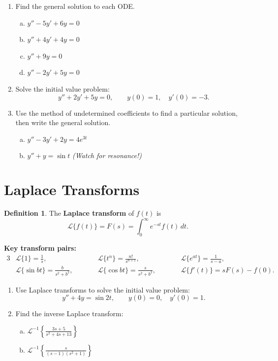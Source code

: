 \documentclass[11pt]{article}
\theoremstyle{definition}
\newtheorem*{definition*}{Definition}
\newcommand{\Lap}{\mathscr{L}}
\newcommand{\invLap}{\mathscr{L}^{-1}}
\begin{document}
\begin{enumerate}[resume]
\item Find the general solution to each ODE.
\begin{enumerate}[(a)]
  \item $y'' - 5y' + 6y = 0$
  \item $y'' + 4y' + 4y = 0$
  \item $y'' + 9y = 0$
  \item $y'' - 2y' + 5y = 0$
\end{enumerate}

\item Solve the initial value problem:
\[
  y'' + 2y' + 5y = 0, \qquad y(0) = 1, \quad y'(0) = -3.
\]

\item Use the method of undetermined coefficients to find a particular solution, then write the general solution.
\begin{enumerate}[(a)]
  \item $y'' - 3y' + 2y = 4e^{3t}$
  \item $y'' + y = \sin t$ \quad \emph{(Watch for resonance!)}
\end{enumerate}
\end{enumerate}

\section*{Laplace Transforms}

\begin{definition*}
The \textbf{Laplace transform} of $f(t)$ is
\[
  \Lap\{f(t)\} = F(s) = \int_0^{\infty} e^{-st} f(t) \, dt.
\]
\end{definition*}

\textbf{Key transform pairs:}
\begin{alignat*}{3}
  &\Lap\{1\} = \frac{1}{s}, \qquad
  &&\Lap\{t^n\} = \frac{n!}{s^{n+1}}, \qquad
  &&\Lap\{e^{at}\} = \frac{1}{s - a}, \\[6pt]
  &\Lap\{\sin bt\} = \frac{b}{s^2 + b^2}, \qquad
  &&\Lap\{\cos bt\} = \frac{s}{s^2 + b^2}, \qquad
  &&\Lap\{f'(t)\} = s F(s) - f(0).
\end{alignat*}

\begin{enumerate}[resume]
\item Use Laplace transforms to solve the initial value problem:
\[
  y'' + 4y = \sin 2t, \qquad y(0) = 0, \quad y'(0) = 1.
\]

\item Find the inverse Laplace transform:
\begin{enumerate}[(a)]
  \item $\displaystyle \invLap\left\{ \frac{3s + 5}{s^2 + 4s + 13} \right\}$

  \item $\displaystyle \invLap\left\{ \frac{s}{(s-1)(s^2 + 1)} \right\}$
\end{enumerate}
\end{enumerate}
\end{document}

